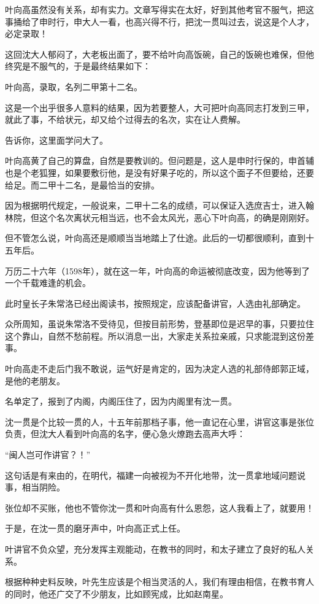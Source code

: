 \begin{multicols}{\theparacolNo}
		叶向高虽然没有关系，却有实力。文章写得实在太好，好到其他考官不服气，把这事捅给了申时行，申大人一看，也高兴得不行，把沈一贯叫过去，说这是个人才，必定录取！

		这回沈大人郁闷了，大老板出面了，要不给叶向高饭碗，自己的饭碗也难保，但他终究是不服气的，于是最终结果如下：

		叶向高，录取，名列二甲第十二名。

		这是一个出乎很多人意料的结果，因为若要整人，大可把叶向高同志打发到三甲，就此了事，不给状元，却又给个过得去的名次，实在让人费解。

		告诉你，这里面学问大了。

		叶向高黄了自己的算盘，自然是要教训的。但问题是，这人是申时行保的，申首辅也是个老狐狸，如果要敷衍他，是没有好果子吃的，所以这个面子不但要给，还要给足。而二甲十二名，是最恰当的安排。

		因为根据明代规定，一般说来，二甲十二名的成绩，可以保证入选庶吉士，进入翰林院，但这个名次离状元相当远，也不会太风光，恶心下叶向高，的确是刚刚好。

		但不管怎么说，叶向高还是顺顺当当地踏上了仕途。此后的一切都很顺利，直到十五年后。

		万历二十六年（1598年），就在这一年，叶向高的命运被彻底改变，因为他等到了一个千载难逢的机会。

		此时皇长子朱常洛已经出阁读书，按照规定，应该配备讲官，人选由礼部确定。

		众所周知，虽说朱常洛不受待见，但按目前形势，登基即位是迟早的事，只要拉住这个靠山，自然不愁前程。所以消息一出，大家走关系拉亲戚，只求能混到这份差事。

		叶向高走不走后门我不敢说，运气好是肯定的，因为决定人选的礼部侍郎郭正域，是他的老朋友。

		名单定了，报到了内阁，内阁压住了，因为内阁里有沈一贯。

		沈一贯是个比较一贯的人，十五年前那档子事，他一直记在心里，讲官这事是张位负责，但沈大人看到叶向高的名字，便心急火燎跑去高声大呼：

		“闽人岂可作讲官？！”

		这句话是有来由的，在明代，福建一向被视为不开化地带，沈一贯拿地域问题说事，相当阴险。

		张位却不买账，他也不管你沈一贯和叶向高有什么恩怨，这人我看上了，就要用！

		于是，在沈一贯的磨牙声中，叶向高正式上任。

		叶讲官不负众望，充分发挥主观能动，在教书的同时，和太子建立了良好的私人关系。

		根据种种史料反映，叶先生应该是个相当灵活的人，我们有理由相信，在教书育人的同时，他还广交了不少朋友，比如顾宪成，比如赵南星。


\end{multicols}
